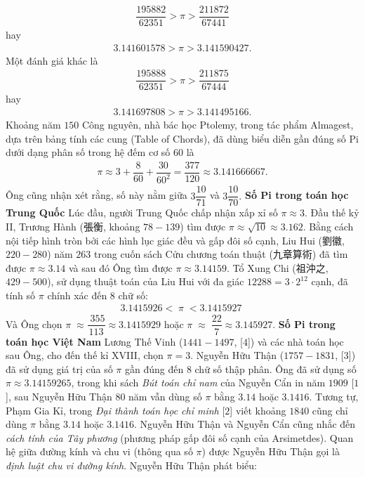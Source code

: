 \begin{multicols}{2}
	\begin{align*}
		\dfrac{{195882}}{{62351}} > \pi  > \dfrac{{211872}}{{67441}}
	\end{align*}
	hay 
	\begin{align*}
		3.141601578 > \pi  > 3.141590427.
	\end{align*}
	Một đánh giá khác là 
	\begin{align*}
		\dfrac{{195888}}{{62351}} > \pi  > \dfrac{{211875}}{{67444}}
	\end{align*}
	hay 
	\begin{align*}
		3.141697808 > \pi  > 3.141495166.
	\end{align*}
	Khoảng năm $150$ Công nguyên, nhà bác học Ptolemy, trong tác phẩm Almagest, dựa trên bảng tính các cung (Table of Chords), đã dùng biểu diễn gần đúng số Pi dưới dạng phân số trong hệ đếm cơ số $60$ là 
	\begin{align*}
		\pi  \approx 3 + \dfrac{8}{{60}} + \dfrac{{30}}{{{{60}^2}}} = \dfrac{{377}}{{120}} \approx 3.141666667.
	\end{align*}
	Ông cũng nhận xét rằng, số này nằm giữa $3\dfrac{{10}}{{71}}$  và  $3\dfrac{{10}}{{70}}.$
	\vskip 0.1cm
	\textbf{\color{lichsutoanhoc}Số Pi trong toán học Trung Quốc}
	\vskip 0.1cm
	Lúc đầu, người Trung Quốc chấp nhận xấp xỉ số $\pi \approx 3$. Đầu thế kỷ II, Trương Hành (張衡, khoảng $78-139$) tìm được  $\pi  \approx \sqrt {10}  \approx 3.162$. Bằng cách nội tiếp hình tròn bởi các hình lục giác đều và gấp đôi số cạnh, Liu Hui (劉徽, $220-280$) năm $263$ trong cuốn sách Cửu chương toán thuật (九章算術) đã tìm được $\pi  \approx 3.14$  và sau đó Ông tìm được  $\pi  \approx 3.14159.$ Tổ Xung Chi (祖沖之, $429-500$), sử dụng thuật toán của Liu Hui với đa giác $12288 = 3 \cdot {2^{12}}$  cạnh, đã tính số $\pi$  chính xác đến $8$ chữ số:
	\begin{align*}
		3.1415926 < \;\pi \; < 3.1415927\;
	\end{align*}
	Và Ông chọn $\pi \; \approx \dfrac{{\;355}}{{113}} \approx 3.1415929$
	hoặc  $\pi \; \approx \;\dfrac{{22}}{7} \approx 3.145927$. 
	\vskip 0.1cm
	\textbf{\color{lichsutoanhoc}Số Pi trong toán học Việt Nam}
	\vskip 0.1cm
	Lương Thế Vinh ($1441-1497$, [$4$]) và các nhà toán học sau Ông, cho đến thế kỉ XVIII, chọn $\pi = 3$.  Nguyễn Hữu Thận ($1757-1831$, [$3$]) đã sử dụng giá trị của số $\pi$ gần đúng đến $8$ chữ số thập phân. Ông đã sử dụng số $\pi  \approx 3.14159265$,  trong khi sách \textit{Bút toán chỉ nam} của Nguyễn Cẩn in năm $1909$ [$1$], sau Nguyễn Hữu Thận $80$ năm vẫn dùng số  $\pi$  bằng $3.14$ hoặc $3.1416$. Tương tự, Phạm Gia Kỉ, trong \textit{Đại thành toán học chỉ minh} [$2$] viết khoảng $1840$ cũng chỉ dùng $\pi$  bằng $3.14$ hoặc $3.1416$.  Nguyễn Hữu Thận và Nguyễn Cẩn cũng nhắc đến \textit{cách tính của Tây phương} (phương pháp gấp đôi số cạnh của Arsimetdes). Quan hệ giữa đường kính và chu vi (thông qua số  $\pi$) được Nguyễn Hữu Thận gọi là \textit{định luật chu vi đường kính}. Nguyễn Hữu Thận phát biểu:

\end{multicols}
